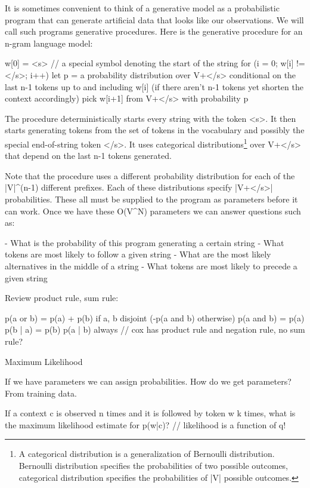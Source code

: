 \documentclass[ignorenonframetext]{beamer}
\begin{document}
It is sometimes convenient to think of a generative model as a
probabilistic program that can generate artificial data that looks
like our observations.  We will call such programs generative
procedures.  Here is the generative procedure for an n-gram language
model:

w[0] = <s>  // a special symbol denoting the start of the string
for (i = 0; w[i] != </s>; i++) {
  let p = a probability distribution over V+</s> conditional on the
  last n-1 tokens up to and including w[i] (if there aren't n-1 tokens
  yet shorten the context accordingly)
  pick w[i+1] from V+</s> with probability p
}

The procedure deterministically starts every string with the token
<s>.  It then starts generating tokens from the set of tokens in the
vocabulary and possibly the special end-of-string token </s>.  It uses
categorical distributions\footnote{A categorical distribution is a
  generalization of Bernoulli distribution.  Bernoulli distribution
  specifies the probabilities of two possible outcomes, categorical
  distribution specifies the probabilities of |V| possible outcomes.}
over V+</s> that depend on the last n-1 tokens generated.

Note that the procedure uses a different probability distribution for
each of the |V|^(n-1) different prefixes.  Each of these distributions
specify |V+</s>| probabilities.  These all must be supplied to the
program as parameters before it can work.  Once we have these O(V^N)
parameters we can answer questions such as:

- What is the probability of this program generating a certain string
- What tokens are most likely to follow a given string
- What are the most likely alternatives in the middle of a string
- What tokens are most likely to precede a given string

Review product rule, sum rule:

p(a or b) = p(a) + p(b) if a, b disjoint (-p(a and b) otherwise)
p(a and b) = p(a) p(b | a) = p(b) p(a | b)  always
// cox has product rule and negation rule, no sum rule?



Maximum Likelihood

If we have parameters we can assign probabilities.  How do we get
parameters?  From training data.

If a context c is observed n times and it is followed by token w k
times, what is the maximum likelihood estimate for p(w|c)?
// likelihood is a function of q!
\end{document}
